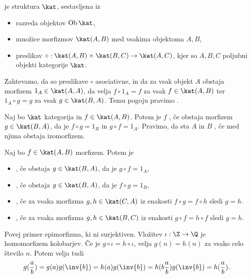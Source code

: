 
\begin{definicija}
   je struktura $\kat$, sestavljena iz
  \begin{itemize}
  \item razreda objektov $\operatorname{Ob} \kat$,
  \item množice morfizmov $\kat(A,B)$ med vsakima objektoma $A, B$,
  \item preslikav $\circ : \kat(A,B) \times \kat(B,C) \to \kat(A,C)$, kjer so
	$A, B, C$ poljubni objekti kategorije $\kat$.
  \end{itemize}
  Zahtevamo, da so preslikave $\circ$ asociativne, in da za vsak objekt $A$
  obstaja morfizem $1_A \in \kat(A,A)$, da velja $f \circ 1_A = f$ za vsak $f
  \in \kat(A,B)$ ter $1_A \circ g = g$ za vsak $g \in \kat(B,A)$.
  Temu pogoju pravimo .
\end{definicija}


\begin{definicija}
  Naj bo $\kat$ kategorija in $f \in \kat(A,B)$.
  Potem je $f$ , če obstaja morfizem $g \in \kat(B,A)$, da je
  $f \circ g = 1_B$ in $g \circ f = 1_A$.
  Pravimo, da sta $A$ in $B$ , če med njima obstaja izomorfizem.
\end{definicija}

\begin{definicija}
  Naj bo $f \in \kat(A,B)$ morfizem.
  Potem je
  \begin{itemize}
  \item {}, če obstaja $g \in \kat(B,A)$, da je $g \circ f = 1_A$,
  \item {}, če obstaja $g \in \kat(B,A)$, da je $f \circ g = 1_B$,
  \item {}, če za vsaka morfizma $g, h \in \kat(C,A)$ iz
	enakosti $f \circ g = f \circ h$ sledi $g = h$.
  \item {}, če za vsaka morfizma $g, h \in \kat(B,C)$ iz
	enakosti $g \circ f = h \circ f$ sledi $g = h$.
  \end{itemize}
\end{definicija}


\begin{vo}{Povej primer epimorfizma, ki ni surjektiven.}
  Vložitev $\iota: \Z \to \Q$ je homomorfizem kolobarjev.
  Če je $g \circ \iota = h \circ \iota$, velja $g(n) = h(n)$ za vsako celo
  število $n$.
  Potem velja tudi
  \[
	g(\frac{a}{b}) = g(a) g(\inv{b})
	= h(a) g(\inv{b})
	= h(b \frac{a}{b}) g(\inv{b})
	= h(\frac{a}{b}).
  \]
\end{vo}

